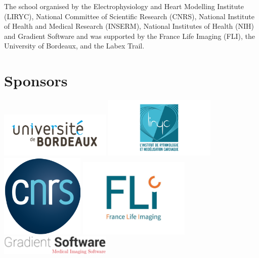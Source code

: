 \begin{center}
The school organised by the Electrophysiology and Heart Modelling Institute (LIRYC), National Committee of Scientific Research (CNRS), National Institute of Health and Medical Research (INSERM), National Institutes of Health (NIH) and Gradient Software and was supported by the France Life Imaging (FLI), the University of Bordeaux, and the Labex Trail.
\end{center}

\vfill

\section{Sponsors}

\begin{center}
\includegraphics[width=0.4\textwidth]{images/logos/logo_UB.jpg}
\includegraphics[width=0.4\textwidth]{images/logos/logo_liryc.png}
\includegraphics[width=0.30\textwidth]{images/logos/logo_CNRS.png}
\includegraphics[width=0.4\textwidth]{images/logos/logo_FLI.jpg}
\includegraphics[width=0.4\textwidth]{images/logos/logo_gradient_software.png}

\end{center}
